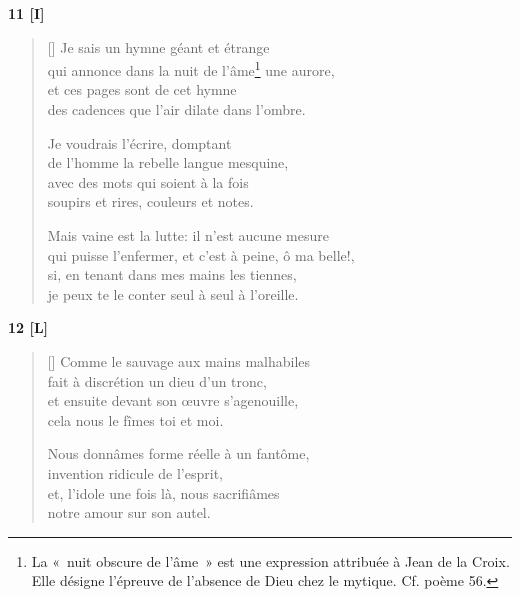 \documentclass[a4paper,12pt]{book}
\begin{document}
\bigskip

\begin{center}
  \textbf{11 [I]}
\end{center}

\settowidth{\versewidth}{qui puisse l'enfermer, et c'est à peine, ô ma belle!,}

\begin{verse}[\versewidth]
  Je sais un hymne géant et étrange \\
  qui annonce dans la nuit de l'âme\footnote{La «~nuit obscure de
  l'âme~» est une expression attribuée à Jean de la Croix. Elle
  désigne l'épreuve de l'absence de Dieu chez le mytique. Cf. poème 56.} une aurore, \\
  et ces pages sont de cet hymne \\
  des cadences que l'air dilate dans l'ombre.

  Je voudrais l'écrire, domptant \\
  de l'homme la rebelle langue mesquine, \\
  avec des mots qui soient à la fois \\
  soupirs et rires, couleurs et notes.

  Mais vaine est la lutte: il n'est aucune mesure \\
  qui puisse l'enfermer, et c'est à peine, ô ma belle!, \\
  si, en tenant dans mes mains les tiennes, \\
  je peux te le conter seul à seul à l'oreille.
\end{verse}

\bigskip

\begin{center}
  \textbf{12 [L]}
\end{center}

\settowidth{\versewidth}{et, l'idole une fois là, nous sacrifiâmes}

\begin{verse}[\versewidth]
  Comme le sauvage aux mains malhabiles \\
  fait à discrétion un dieu d'un tronc, \\
  et ensuite devant son œuvre s'agenouille, \\
  cela nous le fîmes toi et moi.

  Nous donnâmes forme réelle à un fantôme, \\
  invention ridicule de l'esprit, \\
  et, l'idole une fois là, nous sacrifiâmes \\
  notre amour sur son autel.
\end{verse}
\end{document}
